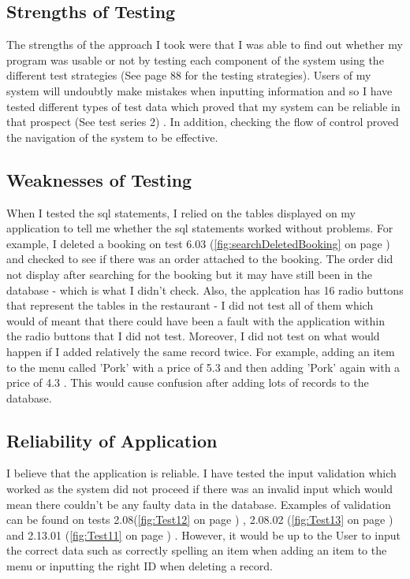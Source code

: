 \subsection{Strengths of Testing}

The strengths of the approach I took were that I was able to find out whether my program was usable or not by testing each component of the system using the different test strategies (See page 88 for the testing strategies). Users of my system will undoubtly make mistakes when inputting information and so I have tested different types of test data which proved that my system can be reliable in that prospect (See test series 2) . In addition, checking the flow of control proved the navigation of the system to be effective.

\subsection{Weaknesses of Testing}

When I tested the sql statements, I relied on the tables displayed on my application to tell me whether the sql statements worked without problems. For example, I deleted a booking on test 6.03 (\ref{fig:searchDeletedBooking} on page \pageref{fig:searchDeletedBooking}) and checked to see if there was an order attached to the booking. The order did not display after searching for the booking but it may have still been in the database - which is what I didn't check. Also, the applcation has 16 radio buttons that represent the tables in the restaurant - I did not test all of them which would of meant that there could have been a fault with the application within the radio buttons that I did not test. Moreover, I did not test on what would happen if I added relatively the same record twice. For example, adding an item to the menu called 'Pork' with a price of 5.3 and then adding 'Pork' again with a price of 4.3 . This would cause confusion after adding lots of records to the database. 

\subsection{Reliability of Application}

I believe that the application is reliable. I have tested the input validation which worked as the system did not proceed if there was an invalid input which would mean there couldn't be any faulty data in the database. Examples of validation can be found on tests 2.08(\ref{fig:Test12} on page \pageref{fig:Test12}) , 2.08.02 (\ref{fig:Test13} on page \pageref{fig:Test13}) and 2.13.01 (\ref{fig:Test11} on page \pageref{fig:Test11}) . However, it would be up to the User to input the correct data such as correctly spelling an item when adding an item to the menu or inputting the right ID when deleting a record.


